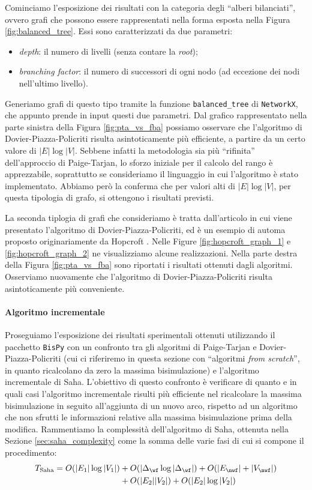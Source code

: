 Cominciamo l'esposizione dei risultati con la categoria degli ``alberi bilanciati'', ovvero grafi che possono essere rappresentati nella forma esposta nella Figura \ref{fig:balanced_tree}. Essi sono caratterizzati da due parametri:
\begin{itemize}
    \item \emph{depth}: il numero di livelli (senza contare la \emph{root});
    \item \emph{branching factor}: il numero di successori di ogni nodo (ad eccezione dei nodi nell'ultimo livello).
\end{itemize}
Generiamo grafi di questo tipo tramite la funzione \verb|balanced_tree| di \texttt{NetworkX}, che appunto prende in input questi due parametri. Dal grafico rappresentato nella parte sinistra della Figura \ref{fig:pta_vs_fba} possiamo osservare che l'algoritmo di Dovier-Piazza-Policriti risulta asintoticamente più efficiente, a partire da un certo valore di $|E| \log |V|$. Sebbene infatti la metodologia sia più ``rifinita'' dell'approccio di Paige-Tarjan, lo sforzo iniziale per il calcolo del rango è apprezzabile, soprattutto se consideriamo il linguaggio in cui l'algoritmo è stato implementato. Abbiamo però la conferma che per valori alti di $|E| \log |V|$, per questa tipologia di grafo, si ottengono i risultati previsti.

La seconda tiplogia di grafi che consideriamo è tratta dall'articolo in cui viene presentato l'algoritmo di Dovier-Piazza-Policriti, ed è un esempio di automa proposto originariamente da Hopcroft \cite{hopcroft}. Nelle Figure \ref{fig:hopcroft_graph_1} e \ref{fig:hopcroft_graph_2} ne visualizziamo alcune realizzazioni. Nella parte destra della Figura \ref{fig:pta_vs_fba} sono riportati i risultati ottenuti dagli algoritmi. Osserviamo nuovamente che l'algoritmo di Dovier-Piazza-Policriti risulta asintoticamente più conveniente.

\paragraph{Algoritmo incrementale} Proseguiamo l'esposizione dei risultati sperimentali ottenuti utilizzando il pacchetto \texttt{BisPy} con un confronto tra gli algoritmi di Paige-Tarjan e Dovier-Piazza-Policriti (cui ci riferiremo in questa sezione con ``algoritmi \emph{from scratch}'', in quanto ricalcolano da zero la massima bisimulazione) e l'algoritmo incrementale di Saha. L'obiettivo di questo confronto è verificare di quanto e in quali casi l'algoritmo incrementale risulti più efficiente nel ricalcolare la massima bisimulazione in seguito all'aggiunta di un nuovo arco, rispetto ad un algoritmo che non sfrutti le informazioni relative alla massima bisimulazione prima della modifica. Rammentiamo la complessità dell'algoritmo di Saha, ottenuta nella Sezione \ref{sec:saha_complexity} come la somma delle varie fasi di cui si compone il procedimento:
\begin{align}\label{eq:saha}
    T_{\text{Saha}} = O(|E_1|\log|V_1|) &+ O(|\Delta_{\wf}\log|\Delta_{\wf}|) + O(|E_{\nwf}| + |V_{\nwf}|)\\
    &+ O(|E_2||V_2|) + O(|E_2|\log|V_2|)
\end{align}

